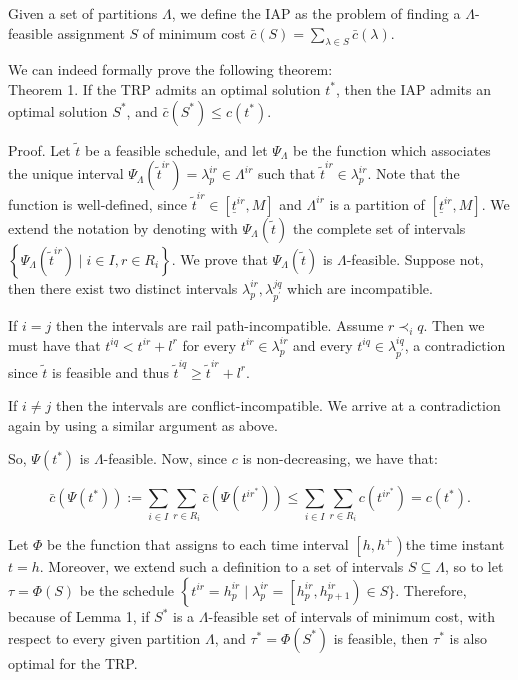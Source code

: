 \documentclass[10pt]{article}
\begin{document}
Given a set of partitions $\Lambda$, we define the IAP as the problem of finding a $\Lambda$-feasible assignment $S$ of minimum cost $\bar{c}(S)=\sum_{\lambda \in S} \bar{c}(\lambda)$.

We can indeed formally prove the following theorem:\\
Theorem 1. If the TRP admits an optimal solution $t^{*}$, then the IAP admits an optimal solution $S^{*}$, and $\bar{c}\left(S^{*}\right) \leq c\left(t^{*}\right)$.

Proof. Let $\tilde{t}$ be a feasible schedule, and let $\Psi_{\Lambda}$ be the function which associates the unique interval $\Psi_{\Lambda}\left(\tilde{t}^{i r}\right)=\lambda_{p}^{i r} \in \Lambda^{i r}$ such that $\tilde{t}^{i r} \in \lambda_{p}^{i r}$. Note that the function is well-defined, since $\tilde{t}^{i r} \in\left[\underline{t}^{i r}, M\right]$ and $\Lambda^{i r}$ is a partition of $\left[\underline{t}^{i r}, M\right]$. We extend the notation by denoting with $\Psi_{\Lambda}(\tilde{t})$ the complete set of intervals $\left\{\Psi_{\Lambda}\left(\tilde{t}^{i r}\right) \mid i \in I, r \in R_{i}\right\}$. We prove that $\Psi_{\Lambda}(\tilde{t})$ is $\Lambda$-feasible. Suppose not, then there exist two distinct intervals $\lambda_{p}^{i r}, \lambda_{p^{\prime}}^{j q}$ which are incompatible.

If $i=j$ then the intervals are rail path-incompatible. Assume $r \prec_{i} q$. Then we must have that $t^{i q}<t^{i r}+l^{r}$ for every $t^{i r} \in \lambda_{p}^{i r}$ and every $t^{i q} \in \lambda_{p^{\prime}}^{i q}$, a contradiction since $\tilde{t}$ is feasible and thus $\tilde{t}^{i q} \geq \tilde{t}^{i r}+l^{r}$.

If $i \neq j$ then the intervals are conflict-incompatible. We arrive at a contradiction again by using a similar argument as above.

So, $\Psi\left(t^{*}\right)$ is $\Lambda$-feasible. Now, since $c$ is non-decreasing, we have that:

$$
\bar{c}\left(\Psi\left(t^{*}\right)\right):=\sum_{i \in I} \sum_{r \in R_{i}} \bar{c}\left(\Psi\left(t^{i r^{*}}\right)\right) \leq \sum_{i \in I} \sum_{r \in R_{i}} c\left(t^{i r^{*}}\right)=c\left(t^{*}\right) .
$$

Let $\Phi$ be the function that assigns to each time interval $\left[h, h^{+}\right)$the time instant $t=h$. Moreover, we extend such a definition to a set of intervals $S \subseteq \Lambda$, so to let $\tau=\Phi(S)$ be the schedule $\left\{t^{i r}=h_{p}^{i r} \mid \lambda_{p}^{i r}=\left[h_{p}^{i r}, h_{p+1}^{i r}\right) \in\right. S\}$. Therefore, because of Lemma 1, if $S^{*}$ is a $\Lambda$-feasible set of intervals of minimum cost, with respect to every given partition $\Lambda$, and $\tau^{*}=\Phi\left(S^{*}\right)$ is feasible, then $\tau^{*}$ is also optimal for the TRP.
\end{document}
